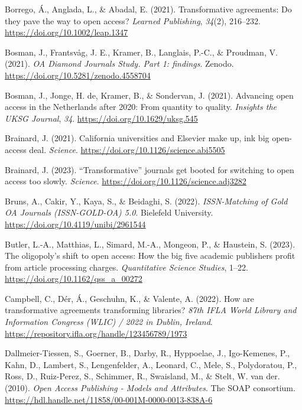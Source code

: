 \documentclass[a4paper,man,floatsintext,longtable,noextraspace,12pt]{apa6}
\newenvironment{CSLReferences}%
  {}%
  {\par}
\begin{document}
\begin{CSLReferences}{1}{0}
\leavevmode{}%
Borrego, Á., Anglada, L., \& Abadal, E. (2021). Transformative
agreements: Do they pave the way to open access? \emph{Learned
Publishing}, \emph{34}(2), 216--232.
\url{https://doi.org/10.1002/leap.1347}

\leavevmode{}%
Bosman, J., Frantsvåg, J. E., Kramer, B., Langlais, P.-C., \& Proudman,
V. (2021). \emph{{OA Diamond Journals Study}. Part 1: findings}. Zenodo.
\url{https://doi.org/10.5281/zenodo.4558704}

\leavevmode{}%
Bosman, J., Jonge, H. de, Kramer, B., \& Sondervan, J. (2021). Advancing
open access in the {Netherlands} after 2020: From quantity to quality.
\emph{Insights the UKSG Journal}, \emph{34}.
\url{https://doi.org/10.1629/uksg.545}

\leavevmode{}%
Brainard, J. (2021). California universities and {Elsevier} make up, ink
big open-access deal. \emph{Science}.
\url{https://doi.org/10.1126/science.abi5505}

\leavevmode{}%
Brainard, J. (2023). {``Transformative''} journals get booted for
switching to open access too slowly. \emph{Science}.
\url{https://doi.org/10.1126/science.adj3282}

\leavevmode{}%
Bruns, A., Cakir, Y., Kaya, S., \& Beidaghi, S. (2022).
\emph{{ISSN-Matching of Gold OA Journals (ISSN-GOLD-OA) 5.0}}. Bielefeld
University. \url{https://doi.org/10.4119/unibi/2961544}

\leavevmode{}%
Butler, L.-A., Matthias, L., Simard, M.-A., Mongeon, P., \& Haustein, S.
(2023). The oligopoly's shift to open access: How the big five academic
publishers profit from article processing charges. \emph{Quantitative
Science Studies}, 1--22. \url{https://doi.org/10.1162/qss_a_00272}

\leavevmode{}%
Campbell, C., Dér, Á., Geschuhn, K., \& Valente, A. (2022). How are
transformative agreements transforming libraries? \emph{87th IFLA World
Library and Information Congress (WLIC) / 2022 in Dublin, Ireland}.
\url{https://repository.ifla.org/handle/123456789/1973}

\leavevmode{}%
Dallmeier-Tiessen, S., Goerner, B., Darby, R., Hyppoelae, J.,
Igo-Kemenes, P., Kahn, D., Lambert, S., Lengenfelder, A., Leonard, C.,
Mele, S., Polydoratou, P., Ross, D., Ruiz-Perez, S., Schimmer, R.,
Swaisland, M., \& Stelt, W. van der. (2010). \emph{{Open Access
Publishing - Models and Attributes}}. The SOAP consortium.
\url{https://hdl.handle.net/11858/00-001M-0000-0013-838A-6}


\end{CSLReferences}
\end{document}

